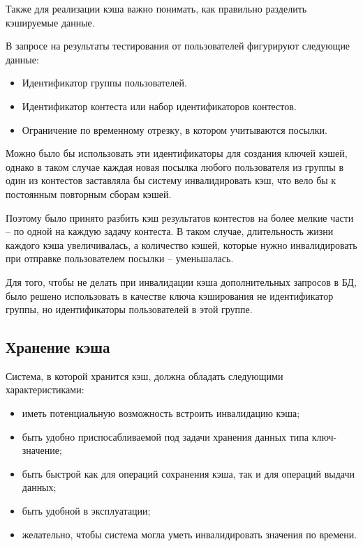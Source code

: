 Также для реализации кэша важно понимать, 
как правильно разделить кэшируемые данные.

В запросе на результаты тестирования от пользователей фигурируют следующие данные: 

\begin{itemize}
    \item Идентификатор группы пользователей.
    \item Идентификатор контеста или набор идентификаторов контестов.
    \item Ограничение по временному отрезку, в котором учитываются посылки.
\end{itemize}

Можно было бы использовать эти идентификаторы для создания ключей кэшей,
однако в таком случае каждая новая посылка любого пользователя из группы в один из контестов заставляла бы систему инвалидировать кэш,
что вело бы к постоянным повторным сборам кэшей.

Поэтому было принято разбить кэш результатов контестов на более мелкие части -- по одной на каждую задачу контеста.
В таком случае, длительность жизни каждого кэша увеличивалась,
а количество кэшей, которые нужно инвалидировать при отправке пользователем посылки -- уменьшалась.

Для того, чтобы не делать при инвалидации кэша дополнительных запросов в БД,
было решено использовать в качестве ключа кэширования не идентификатор группы,
но идентификаторы пользователей в этой группе.

\subsection{Хранение кэша}

Система, в которой хранится кэш, должна обладать следующими характеристиками:

\begin{itemize}
    \item иметь потенциальную возможность встроить инвалидацию кэша;
    \item быть удобно приспосабливаемой под задачи хранения данных типа ключ-значение;
    \item быть быстрой как для операций сохранения кэша, так и для операций выдачи данных;
    \item быть удобной в эксплуатации;
    \item желательно, чтобы система могла уметь инвалидировать значения по времени.
\end{itemize}

